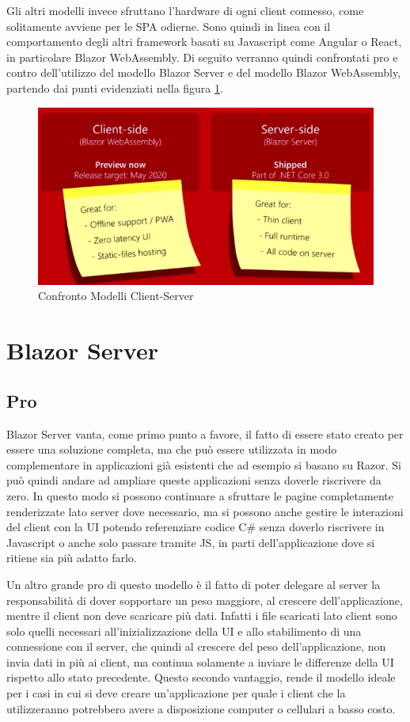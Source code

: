 Gli altri modelli invece sfruttano l'hardware di ogni client connesso, come solitamente avviene per le SPA odierne.
Sono quindi in linea con il comportamento degli altri framework basati su Javascript come Angular o React, in particolare Blazor WebAssembly. 
Di seguito verranno quindi confrontati pro e contro dell'utilizzo del modello Blazor Server e del modello Blazor WebAssembly, partendo dai punti evidenziati nella figura \ref{fig:blazorModelsProCons}.
\begin{figure}[H]
	\centerline{\includegraphics[scale=0.8]{figure/ClientServerProCons.png}}
	\caption{Confronto Modelli Client-Server}
	\label{fig:blazorModelsProCons}
\end{figure}

\section{Blazor Server}\label{sez:scalabilitaBServer}
\subsection{Pro}\label{sez:proBServer}
Blazor Server vanta, come primo punto a favore, il fatto di essere stato creato per essere una soluzione completa, ma che pu\`o essere utilizzata in modo complementare in applicazioni gi\`a esistenti che ad esempio si basano su Razor.
Si pu\`o quindi andare ad ampliare queste applicazioni senza doverle riscrivere da zero.
In questo modo si possono continuare a sfruttare le pagine completamente renderizzate lato server dove necessario, ma si possono anche gestire le interazioni del client con la UI potendo referenziare codice C\# senza doverlo riscrivere in Javascript o anche solo passare tramite JS, in parti dell'applicazione dove si ritiene sia pi\`u adatto farlo.

Un altro grande pro di questo modello \`e il fatto di poter delegare al server la responsabilit\`a di dover sopportare un peso maggiore, al crescere dell'applicazione, mentre il client non deve scaricare pi\`u dati.
Infatti i file scaricati lato client sono solo quelli necessari all'inizializzazione della UI e allo stabilimento di una connessione con il server, che quindi al crescere del peso dell'applicazione, non invia dati in pi\`u ai client, ma continua solamente a inviare le differenze della UI rispetto allo stato precedente.
Questo secondo vantaggio, rende il modello ideale per i casi in cui si deve creare un'applicazione per quale i client che la utilizzeranno potrebbero avere a disposizione computer o cellulari a basso costo.

